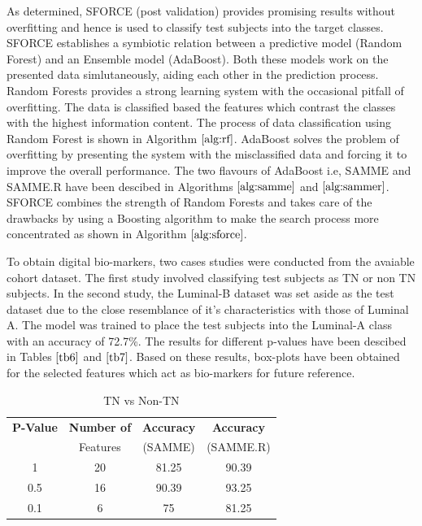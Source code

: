 \documentclass[10pt,journal,compsoc]{IEEEtran}
\begin{document}
As determined, SFORCE (post validation) provides promising results without overfitting and hence is used to classify test subjects into the target classes. SFORCE establishes a symbiotic relation between a predictive model (Random Forest) and an Ensemble model (AdaBoost). Both these models work on the presented data simlutaneously, aiding each other in the prediction process. Random Forests provides a strong learning system with the occasional pitfall of overfitting. The data is classified based the features which contrast the classes with the highest information content. The process of data classification using Random Forest is shown in Algorithm $\ref{alg:rf}$. AdaBoost solves the problem of overfitting by presenting the system with the misclassified data and forcing it to improve the overall performance. The two flavours of AdaBoost i.e, SAMME and SAMME.R have been descibed in Algorithms $\ref{alg:samme}$ and $\ref{alg:sammer}$. SFORCE combines the strength of Random Forests and takes care of the  drawbacks by using a Boosting algorithm to make the search process more concentrated as shown in Algorithm $\ref{alg:sforce}$. 

To obtain digital bio-markers, two cases studies were conducted from the avaiable cohort dataset. The first study involved classifying test subjects as TN or non TN subjects. In the second study, the Luminal-B dataset was set aside as the test dataset due to the close resemblance of it's characteristics with those of Luminal A. The model was trained to place the test subjects into the Luminal-A class with an accuracy of 72.7\%. The results for different p-values have been descibed in Tables $\ref{tb6}$ and $\ref{tb7}$. Based on these results, box-plots have been obtained for the selected features which act as bio-markers for future reference.


\begin{table}[!b]
\scriptsize
\centering
\caption{TN vs Non-TN}
\label{tb6}
\begin{tabular}{| c | c | c | c |}
\hline
\textbf{P-Value} & \textbf{Number of} & \textbf{Accuracy} & \textbf{Accuracy}\\
&Features&(SAMME)&(SAMME.R)\\
\hline
1&20&81.25&90.39\\
\hline
0.5&16&90.39&93.25\\
\hline
0.1&6&75&81.25\\
\hline
\end{tabular}
\end{table}
\end{document}
